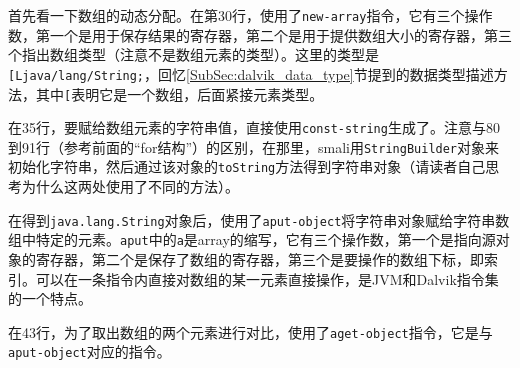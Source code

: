 首先看一下数组的动态分配。在第30行，使用了\lstinline!new-array!指令，它有三个操作数，第一个是用于保存结果的寄存器，第二个是用于提供数组大小的寄存器，第三个指出数组类型（注意不是数组元素的类型）。这里的类型是\lstinline![Ljava/lang/String;!，回忆\ref{SubSec:dalvik_data_type}节提到的数据类型描述方法，其中\lstinline![!表明它是一个数组，后面紧接元素类型。

在35行，要赋给数组元素的字符串值，直接使用\lstinline!const-string!生成了。注意与80到91行（参考前面的“for结构”）的区别，在那里，smali用\lstinline!StringBuilder!对象来初始化字符串，然后通过该对象的\lstinline!toString!方法得到字符串对象（请读者自己思考为什么这两处使用了不同的方法）。

在得到\lstinline!java.lang.String!对象后，使用了\lstinline!aput-object!将字符串对象赋给字符串数组中特定的元素。\lstinline!aput!中的\lstinline!a!是array的缩写，它有三个操作数，第一个是指向源对象的寄存器，第二个是保存了数组的寄存器，第三个是要操作的数组下标，即索引。可以在一条指令内直接对数组的某一元素直接操作，是JVM和Dalvik指令集的一个特点。

在43行，为了取出数组的两个元素进行对比，使用了\lstinline!aget-object!指令，它是与\lstinline!aput-object!对应的指令。

